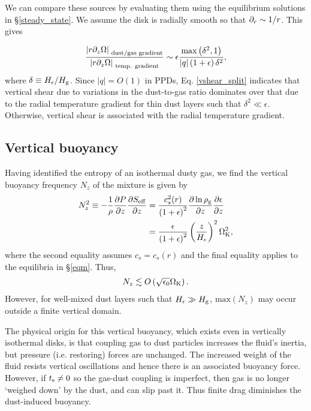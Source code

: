 We can compare these sources by 
evaluating them using the equilibrium
solutions in \S\ref{steady_state}. We assume the disk is radially
smooth so that $\partial_r\sim 1/r$. %
This gives 

\begin{align}\label{vshear_split}
  \frac{\left|r\partial_z\Omega\right|_{\text{
        dust/gas gradient}}}{\left|r\partial_z\Omega\right|_{\text{
        temp. gradient}}} \sim
 \epsilon \frac{\mathrm{max}\left(\delta^2,
    1\right)}{\left|q\right|\left(1+\epsilon\right)\delta^2},
\end{align}
where $\delta\equiv H_\epsilon/H_\mathrm{g}$. 
Since $|q|=O(1)$ in PPDs, Eq. \ref{vshear_split} indicates that
vertical shear due to variations in the dust-to-gas ratio dominates 
over that due to the radial temperature gradient for thin dust layers
such that $\delta^2\ll \epsilon$. Otherwise, vertical shear is
associated with the radial temperature gradient. %

\subsection{Vertical buoyancy}\label{vbuoyancy}
Having identified the entropy of an isothermal dusty gas, we find the
vertical buoyancy frequency $N_z$ of the mixture is given by 
\begin{align}
  N_z^2 \equiv - \frac{1}{\rho}\frac{\partial P}{\partial z}\frac{\partial S_\mathrm{eff}}{\partial z} &=
  \frac{c_s^2(r)}{\left(1+\epsilon\right)^2}\frac{\partial\ln\rho_\mathrm{g}}{\partial 
  z}\frac{\partial\epsilon}{\partial z} \\ &
                                  =
  \frac{\epsilon}{\left(1+\epsilon\right)^2}\left(\frac{z}{H_\epsilon}\right)^2\Omega_{\rm K}^2\notag,  
\end{align}
where the second equality assumes $c_s=c_s(r)$ and the final equality
applies to the equilibria in \S\ref{eqm}. Thus,  
\begin{align*}
N_z\lesssim
O\left(\sqrt{\epsilon_0}\Omega_{\rm K}\right). 
\end{align*}
However, for well-mixed dust layers such that $H_\epsilon \gg H_\mathrm{g}$, 
$\mathrm{max}\left(N_z\right)$ may occur outside a finite vertical domain.  

The physical origin for this vertical buoyancy, which exists even in vertically isothermal
disks, is that coupling gas to dust particles increases
the fluid's inertia, but pressure (i.e. restoring) forces are
unchanged. The increased weight of the fluid resists vertical
oscillations and hence there is an associated buoyancy force. However,
if $t_\mathrm{s}\neq0$ so the gas-dust coupling is imperfect, then gas is no
longer `weighed down' by the dust, and can slip past it. Thus finite
drag diminishes the dust-induced buoyancy.   


